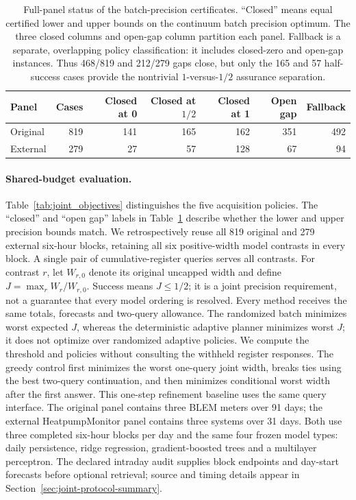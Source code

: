 \documentclass[12pt]{article}
\begin{document}
\begin{table}[htbp]
\centering\small
\begin{tabular}{lrrrrrr}
\toprule
Panel & Cases & Closed at 0 & Closed at $1/2$ & Closed at 1 & Open gap & Fallback\\
\midrule
Original & 819 & 141 & 165 & 162 & 351 & 492\\
External & 279 & 27 & 57 & 128 & 67 & 94\\
\bottomrule
\end{tabular}
\caption{Full-panel status of the batch-precision certificates. ``Closed'' means equal certified lower and upper bounds on the continuum batch precision optimum. The three closed columns and open-gap column partition each panel. Fallback is a separate, overlapping policy classification: it includes closed-zero and open-gap instances. Thus 468/819 and 212/279 gaps close, but only the 165 and 57 half-success cases provide the nontrivial $1$-versus-$1/2$ assurance separation.}
\label{tab:joint_precision_status}
\end{table}
\paragraph{Shared-budget evaluation.}
Table~\ref{tab:joint_objectives} distinguishes the five acquisition policies.
The ``closed'' and ``open gap'' labels in Table~\ref{tab:joint_precision_status}
describe whether the lower and upper precision bounds match.
We retrospectively reuse all 819 original and 279 external six-hour blocks,
retaining all six positive-width model contrasts in every block. A single pair
of cumulative-register queries serves all contrasts. For contrast $r$, let
$W_{r,0}$ denote its original uncapped width and define
$J=\max_r W_r/W_{r,0}$. Success means $J\leq1/2$; it is a joint precision
requirement, not a guarantee that every model ordering is resolved. Every
method receives the same totals, forecasts and two-query allowance. The
randomized batch minimizes worst expected $J$, whereas the deterministic
adaptive planner minimizes worst $J$; it does not optimize over randomized
adaptive policies. We compute the threshold and policies without consulting
the withheld register responses.
The greedy control first minimizes the worst one-query joint width, breaks
ties using the best two-query continuation, and then minimizes conditional
worst width after the first answer. This one-step refinement baseline uses
the same query interface.
The original panel contains three BLEM meters over 91 days; the external
HeatpumpMonitor panel contains three systems over 31 days. Both use three
completed six-hour blocks per day and the same four frozen model types:
daily persistence, ridge regression, gradient-boosted trees and a multilayer
perceptron. The declared intraday audit supplies block endpoints and day-start
forecasts before optional retrieval; source and timing details appear in
Section~\ref{sec:joint-protocol-summary}.
\end{document}
